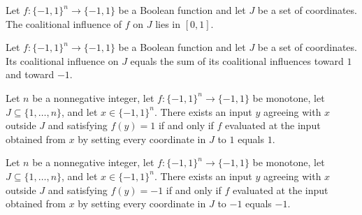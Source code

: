 \begin{theorem}
\label{FABL.coalitionalInfluence_mem_Icc}
\leanok
{}
Let $f:\{−1,1\}^n\to\{−1,1\}$ be a Boolean function and let $J$ be a set of coordinates.
The coalitional influence of $f$ on $J$ lies in $[0,1]$.
\end{theorem}

\begin{theorem}
\label{FABL.coalitionalInfluence_eq_toward_add_toward}
\leanok
{}
Let $f:\{−1,1\}^n\to\{−1,1\}$ be a Boolean function and let $J$ be a set of coordinates.
Its coalitional influence on $J$ equals the sum of its coalitional influences toward $1$
and toward $-1$.
\end{theorem}

\begin{theorem}
\label{FABL.coalitionCanAttain_one_iff_bribe_one}
\leanok
{}
Let $n$ be a nonnegative integer, let $f:\{-1,1\}^n\to\{-1,1\}$ be monotone, let
$J\subseteq\{1,\ldots,n\}$, and let $x\in\{-1,1\}^n$. There exists an input $y$ agreeing
with $x$ outside $J$ and satisfying $f(y)=1$ if and only if $f$ evaluated at the input
obtained from $x$ by setting every coordinate in $J$ to $1$ equals $1$.
\end{theorem}

\begin{theorem}
\label{FABL.coalitionCanAttain_neg_one_iff_bribe_neg_one}
\leanok
{}
Let $n$ be a nonnegative integer, let $f:\{-1,1\}^n\to\{-1,1\}$ be monotone, let
$J\subseteq\{1,\ldots,n\}$, and let $x\in\{-1,1\}^n$. There exists an input $y$ agreeing
with $x$ outside $J$ and satisfying $f(y)=-1$ if and only if $f$ evaluated at the input
obtained from $x$ by setting every coordinate in $J$ to $-1$ equals $-1$.
\end{theorem}

